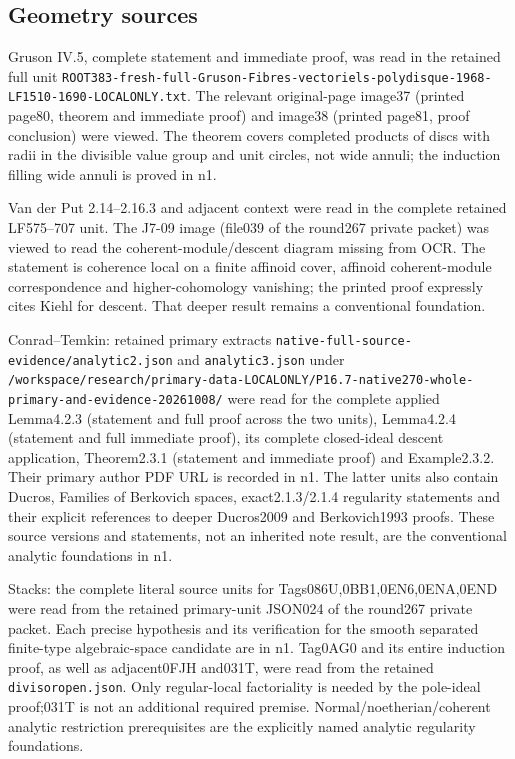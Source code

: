 \documentclass[11pt]{article}
\begin{document}
\subsection*{Geometry sources}

Gruson IV.5, complete statement and immediate proof, was read in the retained full unit \texttt{ROOT383-fresh-full-Gruson-Fibres-vectoriels-polydisque-1968-LF1510-1690-LOCALONLY.txt}. The relevant original-page image37 (printed page80, theorem and immediate proof) and image38 (printed page81, proof conclusion) were viewed. The theorem covers completed products of discs with radii in the divisible value group and unit circles, not wide annuli; the induction filling wide annuli is proved in n1.

Van der Put 2.14--2.16.3 and adjacent context were read in the complete retained LF575--707 unit. The J7-09 image (file039 of the round267 private packet) was viewed to read the coherent-module/descent diagram missing from OCR. The statement is coherence local on a finite affinoid cover, affinoid coherent-module correspondence and higher-cohomology vanishing; the printed proof expressly cites Kiehl for descent. That deeper result remains a conventional foundation.

Conrad--Temkin: retained primary extracts \texttt{native-full-source-evidence/analytic2.json} and \texttt{analytic3.json} under \texttt{/workspace/research/primary-data-LOCALONLY/P16.7-native270-whole-primary-and-evidence-20261008/} were read for the complete applied Lemma4.2.3 (statement and full proof across the two units), Lemma4.2.4 (statement and full immediate proof), its complete closed-ideal descent application, Theorem2.3.1 (statement and immediate proof) and Example2.3.2. Their primary author PDF URL is recorded in n1. The latter units also contain Ducros, Families of Berkovich spaces, exact2.1.3/2.1.4 regularity statements and their explicit references to deeper Ducros2009 and Berkovich1993 proofs. These source versions and statements, not an inherited note result, are the conventional analytic foundations in n1.

Stacks: the complete literal source units for Tags086U,0BB1,0EN6,0ENA,0END were read from the retained primary-unit JSON024 of the round267 private packet. Each precise hypothesis and its verification for the smooth separated finite-type algebraic-space candidate are in n1. Tag0AG0 and its entire induction proof, as well as adjacent0FJH and031T, were read from the retained \texttt{divisoropen.json}. Only regular-local factoriality is needed by the pole-ideal proof;031T is not an additional required premise. Normal/noetherian/coherent analytic restriction prerequisites are the explicitly named analytic regularity foundations.
\end{document}

